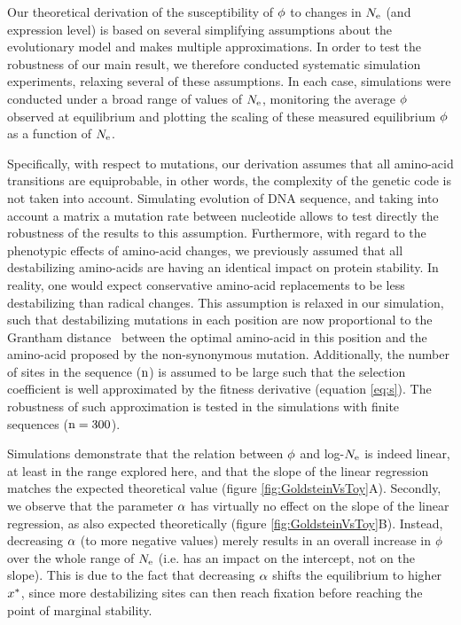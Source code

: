 Our theoretical derivation of the susceptibility of $\phi$ to changes in $N_{\mathrm{e}}$ (and expression level) is based on several simplifying assumptions about the evolutionary model and makes multiple approximations.
In order to test the robustness of our main result, we therefore conducted systematic simulation experiments, relaxing several of these assumptions.
In each case, simulations were conducted under a broad range of values of $N_{\mathrm{e}}$, monitoring the average $\phi$ observed at equilibrium and plotting the scaling of these measured equilibrium $\phi$ as a function of $N_{\mathrm{e}}$.

Specifically, with respect to mutations, our derivation assumes that all amino-acid {transitions} are equiprobable, in other words, the complexity of the genetic code is not taken into account.
Simulating evolution of \acrshort{DNA} sequence, and taking into account a matrix a mutation rate between nucleotide allows to test directly the robustness of the results to this assumption.
Furthermore, with regard to the phenotypic effects of amino-acid changes, we previously assumed that all destabilizing amino-acids are having an identical impact on protein stability.
In reality, one would expect conservative amino-acid replacements to be less destabilizing than radical changes.
This assumption is relaxed in our simulation, such that destabilizing mutations in each position are now proportional to the Grantham distance~\citep{Grantham1974} between the optimal amino-acid in this position and the amino-acid proposed by the non-synonymous mutation.
Additionally, the number of sites in the sequence ($\text{n}$) is assumed to be large such that the selection coefficient is well approximated by the fitness derivative (equation \ref{eq:s}).
The robustness of such approximation is tested in the simulations with finite sequences ($\text{n}=300$).

Simulations demonstrate that the relation between $\phi$ and log-$N_{\mathrm{e}}$ is indeed linear, at least in the range explored here, and that the slope of the linear regression matches the expected theoretical value (figure \ref{fig:GoldsteinVsToy}A).
Secondly, we observe that the parameter $\alpha$ has virtually no effect on the slope of the linear regression, as also expected theoretically (figure \ref{fig:GoldsteinVsToy}B).
Instead, decreasing $\alpha$ (to more negative values) merely results in an overall increase in $\phi$ over the whole range of $N_{\mathrm{e}}$ (i.e. has an impact on the intercept, not on the slope).
This is due to the fact that decreasing $\alpha$ shifts the equilibrium to higher $x^{*}$, since more destabilizing sites can then reach fixation before reaching the point of marginal stability.

